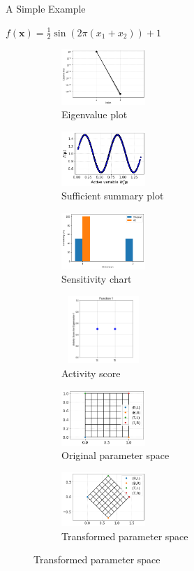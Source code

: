 \documentclass[10pt]{beamer}
\begin{document}
\begin{frame}{A Simple Example}
\begin{center}
    $f(\bm{x})=\frac{1}{2}\sin(2\pi(x_1+x_2))+1$
\end{center}
\begin{figure}
\begin{subfigure}{0.3\textwidth}
    \includegraphics[width=1.25in]{images/f1 eigen.png}
    \caption{Eigenvalue plot}
\end{subfigure}
\begin{subfigure}{0.3\textwidth}
    \includegraphics[width=1.25in]{images/f1 AS.png}
    \caption{Sufficient summary plot}
\end{subfigure}
\begin{subfigure}{0.3\textwidth}
    \includegraphics[width=1.25in]{images/f1sens.png}
    \caption{Sensitivity chart}
\end{subfigure}
\begin{subfigure}{0.3\textwidth}
    \includegraphics[height=1in,width=1.25in]{images/f1ES.png}
    \caption{Activity score}
\end{subfigure}
\begin{subfigure}{0.3\textwidth}
    \includegraphics[width=1.25in]{images/f1 grid.png}
    \caption{Original parameter space}
\end{subfigure}
\begin{subfigure}{0.3\textwidth}
    \includegraphics[width=1.25in]{images/f1 AS mesh.png}
    \caption{Transformed parameter space}
\end{subfigure}
\end{figure}
\end{frame}
\end{document}
